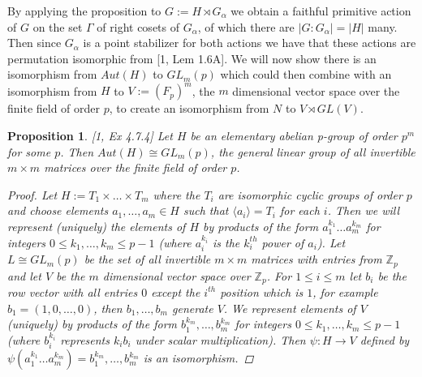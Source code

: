 \documentclass[]{article}
\newtheorem{prop}[thm]{Proposition}
\theoremstyle{definition}
\begin{document}
By applying the proposition to $G:=H \rtimes G_\alpha$ we obtain a faithful primitive action of $G$ on the set $\Gamma$ of right cosets of $G_\alpha$, of which there are $|G:G_\alpha|=|H|$ many. Then since $G_\alpha$ is a point stabilizer for both actions we have that these actions are permutation isomorphic from [1, Lem 1.6A]. We will now show there is an isomorphism from $Aut(H)$ to $GL_m(p)$ which could then combine with an isomorphism from $H$ to $V:=(F_p)^m$, the $m$ dimensional vector space over the finite field of order $p$, to create an isomorphism from $N$ to $V \rtimes GL(V)$.

\begin{prop} \label{prop:affine2} \emph{[1, Ex 4.7.4]}
	Let $H$ be an elementary abelian p-group of order $p^m$ for some $p$. Then $Aut(H) \cong GL_m(p)$, the general linear group of all invertible $m \times m$ matrices over the finite field of order $p$.
\begin{proof}
	Let $H:=T_1 \times \dots \times T_m$ where the $T_i$ are isomorphic cyclic groups of order $p$ and choose elements $a_1,\dots,a_m \in H$ such that $\langle a_i \rangle = T_i$ for each $i$. Then we will represent (uniquely) the elements of $H$ by products of the form $a_1^{k_1}\dots a_m^{k_m}$ for integers $0 \leq k_1,\dots,k_m \leq p-1$ (where $a_i^{k_i}$ is the $k_i^{th}$ power of $a_i$). Let $L \cong GL_m(p)$ be the set of all invertible $m \times m$ matrices with entries from $\mathbb{Z}_p$ and let $V$ be the $m$ dimensional vector space over $\mathbb{Z}_p$. For $1 \leq i \leq m$ let $b_i$ be the row vector with all entries $0$ except the $i^{th}$ position which is $1$, for example $b_1=(1,0,\dots,0)$, then $b_1,\dots,b_m$ generate $V$. We represent elements of $V$ (uniquely) by products of the form $b_1^{k_m},\dots,b_m^{k_m}$ for integers $0 \leq k_1,\dots,k_m \leq p-1$ (where $b_i^{k_i}$ represents $k_ib_i$ under scalar multiplication). Then $\psi:H \rightarrow V$ defined by $\psi(a_1^{k_1}\dots a_m^{k_m})=b_1^{k_m},\dots,b_m^{k_m}$ is an isomorphism.
	

\end{proof}
\end{prop}
\end{document}
